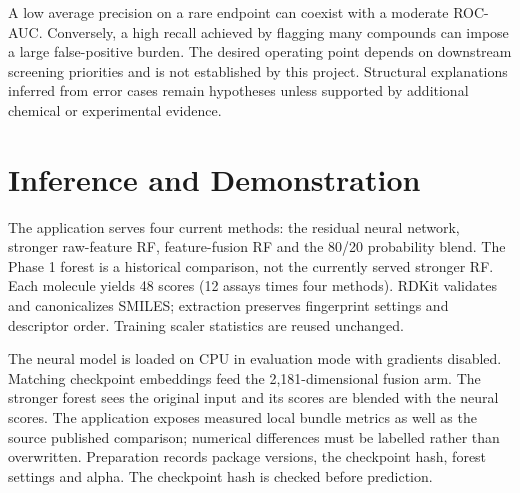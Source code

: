 \documentclass[conference]{IEEEtran}
\begin{document}
A low average precision on a rare endpoint can coexist with a moderate ROC-AUC. Conversely, a high recall achieved by flagging many compounds can impose a large false-positive burden. The desired operating point depends on downstream screening priorities and is not established by this project. Structural explanations inferred from error cases remain hypotheses unless supported by additional chemical or experimental evidence.


\section{Inference and Demonstration}
The application serves four current methods: the residual neural network, stronger raw-feature RF, feature-fusion RF and the 80/20 probability blend. The Phase 1 forest is a historical comparison, not the currently served stronger RF. Each molecule yields 48 scores (12 assays times four methods). RDKit validates and canonicalizes SMILES; extraction preserves fingerprint settings and descriptor order. Training scaler statistics are reused unchanged.

The neural model is loaded on CPU in evaluation mode with gradients disabled. Matching checkpoint embeddings feed the 2,181-dimensional fusion arm. The stronger forest sees the original input and its scores are blended with the neural scores. The application exposes measured local bundle metrics as well as the source published comparison; numerical differences must be labelled rather than overwritten. Preparation records package versions, the checkpoint hash, forest settings and alpha. The checkpoint hash is checked before prediction.
\end{document}
